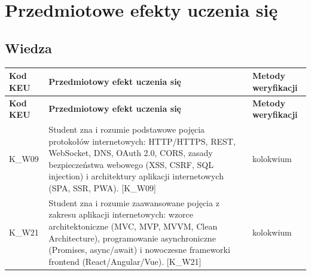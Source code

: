 \documentclass[12pt, a4paper]{article}
\newcommand{\thdrule}{\noalign{\global\setlength{\extrarowheight}{0pt}}}
\newcommand{\thdend}{\noalign{\global\setlength{\extrarowheight}{3pt}}}
\begin{document}
\section{Przedmiotowe efekty uczenia się}

\subsection*{Wiedza}
{\scriptsize
\begin{longtable}{m{1.6cm}m{9.0cm}m{4.2cm}}
\thdrule\toprule
\rowcolor{pjatkRed} {\color{white}\footnotesize\textbf{\vphantom{Ag}Kod KEU}} & {\color{white}\footnotesize\textbf{\vphantom{Ag}Przedmiotowy efekt uczenia się}} & {\color{white}\footnotesize\textbf{\vphantom{Ag}Metody weryfikacji}} \\
\midrule\thdend
\endfirsthead
\thdrule\toprule
\rowcolor{pjatkRed} {\color{white}\footnotesize\textbf{\vphantom{Ag}Kod KEU}} & {\color{white}\footnotesize\textbf{\vphantom{Ag}Przedmiotowy efekt uczenia się}} & {\color{white}\footnotesize\textbf{\vphantom{Ag}Metody weryfikacji}} \\
\midrule\thdend
\endhead
  \rowcolor{tableRowLight} K\_W09 & Student zna i rozumie podstawowe pojęcia protokołów internetowych: HTTP/HTTPS, REST, WebSocket, DNS, OAuth 2.0, CORS, zasady bezpieczeństwa webowego (XSS, CSRF, SQL injection) i architektury aplikacji internetowych (SPA, SSR, PWA). {[}K\_W09{]} & kolokwium \\
  \rowcolor{tableRowAlt} K\_W21 & Student zna i rozumie zaawansowane pojęcia z zakresu aplikacji internetowych: wzorce architektoniczne (MVC, MVP, MVVM, Clean Architecture), programowanie asynchroniczne (Promises, async/await) i nowoczesne frameworki frontend (React/Angular/Vue). {[}K\_W21{]} & kolokwium \\
\bottomrule
\end{longtable}}
\end{document}
